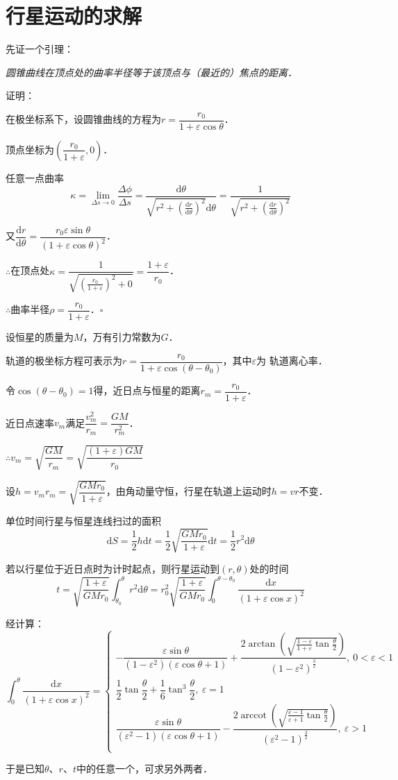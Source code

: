 \documentclass[UTF8,fontset=none,linespread=1.2]{ctexart}
\DeclareMathOperator{\arctanh}{arccot}
\newcommand{\upd}{\mathrm{d}}
\begin{document}
\section*{行星运动的求解}
\noindent 先证一个引理：

\textit{圆锥曲线在顶点处的曲率半径等于该顶点与（最近的）焦点的距离．}

\noindent 证明：

在极坐标系下，设圆锥曲线的方程为$r=\dfrac{r_0}{1+\varepsilon\cos\theta}$．

顶点坐标为$\left(\dfrac{r_0}{1+\varepsilon},0\right)$．

任意一点曲率$$\kappa=\lim_{\Delta s\to 0}\dfrac{\Delta\phi}{\Delta s}
=\dfrac{\upd\theta}{\sqrt{r^2+\left(\frac{\upd r}{\upd\theta}\right)^2}\upd\theta}
=\dfrac{1}{\sqrt{r^2+\left(\frac{\upd r}{\upd\theta}\right)^2}}$$

又$\dfrac{\upd r}{\upd\theta}=\dfrac{r_0\varepsilon\sin\theta}{(1+\varepsilon\cos\theta)^2}$．

$\therefore$在顶点处$\kappa=\dfrac{1}{\sqrt{\left(\frac{r_0}{1+\varepsilon}\right)^2+0}}=\dfrac{1+\varepsilon}{r_0}$．

$\therefore$曲率半径$\rho=\dfrac{r_0}{1+\varepsilon}$．\hfill$\square$

\vspace{4ex}
设恒星的质量为$M$，万有引力常数为$G$．

轨道的极坐标方程可表示为$r=\dfrac{r_0}{1+\varepsilon\cos(\theta-\theta_0)}$，其中$\varepsilon$为
轨道离心率．

令$\cos(\theta-\theta_0)=1$得，近日点与恒星的距离$r_m=\dfrac{r_0}{1+\varepsilon}$．

近日点速率$v_m$满足$\dfrac{v_m^2}{r_m}=\dfrac{GM}{r_m^2}$．

$\therefore v_m=\sqrt{\dfrac{GM}{r_m}}=\sqrt{\dfrac{(1+\varepsilon)GM}{r_0}}$

设$h=v_mr_m=\sqrt{\dfrac{GMr_0}{1+\varepsilon}}$，由角动量守恒，行星在轨道上运动时$h=vr$不变．

单位时间行星与恒星连线扫过的面积$$\upd S=\dfrac12h\upd t=\dfrac12\sqrt{\dfrac{GMr_0}{1+\varepsilon}}\upd t=\dfrac12r^2\upd\theta$$

若以行星位于近日点时为计时起点，则行星运动到$(r,\theta)$处的时间$$t=\sqrt{\dfrac{1+\varepsilon}{GMr_0}}\int_{\theta_0}^{\theta}r^2\upd \theta=r_0^2\sqrt{\dfrac{1+\varepsilon}{GMr_0}}\int_0^{\theta-\theta_0}\dfrac{\upd x}{(1+\varepsilon\cos x)^2}$$

经计算：$$\int_0^{\theta}\dfrac{\upd x}{(1+\varepsilon\cos x)^2}=\left\lbrace\begin{array}{l}
-\dfrac{\varepsilon\sin\theta}{(1-\varepsilon^2)(\varepsilon\cos\theta+1)}+\dfrac{2\arctan\left(\sqrt{\frac{1-\varepsilon}{1+\varepsilon}\tan\frac\theta2}\right)}{(1-\varepsilon^2)^{\frac32}},\ 0<\varepsilon<1\\
\dfrac12\tan\dfrac\theta2+\dfrac16\tan^3\dfrac\theta2,\ \varepsilon=1\\
\dfrac{\varepsilon\sin\theta}{(\varepsilon^2-1)(\varepsilon\cos\theta+1)}-\dfrac{2\arctanh\left(\sqrt{\frac{\varepsilon-1}{\varepsilon+1}\tan\frac\theta2}\right)}{(\varepsilon^2-1)^{\frac32}},\ \varepsilon>1\\
\end{array}\right.$$

于是已知$\theta$、$r$、$t$中的任意一个，可求另外两者．
\end{document}
